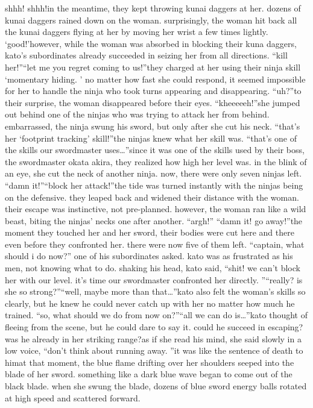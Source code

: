 shhh! shhh!in the meantime, they kept throwing kunai daggers at her.
 dozens of kunai daggers rained down on the woman.
surprisingly, the woman hit back all the kunai daggers flying at her by moving her wrist a few times lightly.
‘good!’however, while the woman was absorbed in blocking their kuna daggers, kato’s subordinates already succeeded in seizing her from all directions.
“kill her!”“let me you regret coming to us!”they charged at her using their ninja skill ‘momentary hiding.
’ no matter how fast she could respond, it seemed impossible for her to handle the ninja who took turns appearing and disappearing.
“uh?”to their surprise, the woman disappeared before their eyes.
“kheeeeeh!”she jumped out behind one of the ninjas who was trying to attack her from behind.
embarrassed, the ninja swung his sword, but only after she cut his neck.
“that’s her ‘footprint tracking’ skill!”the ninjas knew what her skill was.
“that’s one of the skills our swordmaster uses…”since it was one of the skills used by their boss, the swordmaster okata akira, they realized how high her level was.
in the blink of an eye, she cut the neck of another ninja.
now, there were only seven ninjas left.
“damn it!”“block her attack!”the tide was turned instantly with the ninjas being on the defensive.
 they leaped back and widened their distance with the woman.
 their escape was instinctive, not pre-planned.
however, the woman ran like a wild beast, biting the ninjas’ necks one after another.
“argh!”
“damn it! go away!”the moment they touched her and her sword, their bodies were cut here and there even before they confronted her.
there were now five of them left.
“captain, what should i do now?” one of his subordinates asked.
 kato was as frustrated as his men, not knowing what to do.
shaking his head, kato said, “shit! we can’t block her with our level.
 it’s time our swordmaster confronted her directly.
”“really? is she so strong?”“well, maybe more than that…”kato also felt the woman’s skills so clearly, but he knew he could never catch up with her no matter how much he trained.
“so, what should we do from now on?”“all we can do is…”kato thought of fleeing from the scene, but he could dare to say it.
could he succeed in escaping? was he already in her striking range?as if she read his mind, she said slowly in a low voice, “don’t think about running away.
”it was like the sentence of death to himat that moment, the blue flame drifting over her shoulders seeped into the blade of her sword.
something like a dark blue wave began to come out of the black blade.
when she swung the blade, dozens of blue sword energy balls rotated at high speed and scattered forward.
